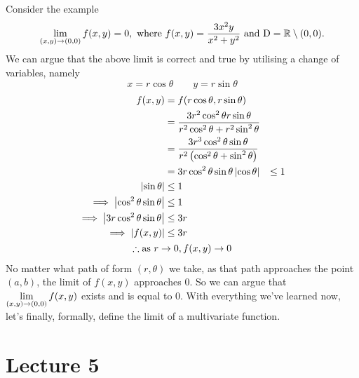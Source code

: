 \documentclass{report}
\begin{document}
\noindent Consider the example 
$$
	\lim_{(x,y)\to(0,0)} f(x,y) = 0, \text{ where } f(x,y) = \frac{3x^2y}{x^2 + y^2} \text{ and } \mathrm{D}=\mathbb{R}\setminus{(0,0)}.
$$
We can argue that the above limit is correct and true by utilising a change of variables, namely $$x=r\cos\theta \qquad y=r\sin\theta$$
\sol
\begin{gather*}
	\begin{aligned}
			f(x,y) &= f(r\cos\theta,r\sin\theta) \\
				&= \frac{3r^2\cos^2\theta r\sin\theta}{r^2\cos^2\theta + r^2\sin^2\theta} \\
				&= \frac{3r^3\cos^2\theta\sin\theta}{r^2\left( \cos^2\theta +\sin^2\theta \right)} \\
				&= 3r\cos^2\theta\sin\theta
			\left| \cos\theta \right| &\leq 1\\ 
			\left| \sin\theta \right| &\leq 1 \\
			\implies \left| \cos^2\theta\sin\theta \right| &\leq 1 \\
			\implies \left| 3r\cos^2\theta\sin\theta \right| &\leq 3r \\
			\implies \left| f(x,y) \right| &\leq 3r 
	\end{aligned} \\
	\therefore \text{as } r\to0, f(x,y)\to 0
\end{gather*}
No matter what path of form $(r,\theta)$ we take, as that path approaches the point $(a,b)$, the limit of $f(x,y)$ approaches 0. So we can argue that $\displaystyle{\lim_{(x,y)\to(0,0)}f(x,y)}$ exists and is equal to 0. With everything we've learned now, let's finally, formally, define the limit of a multivariate function.


\section{Lecture 5}
\end{document}

